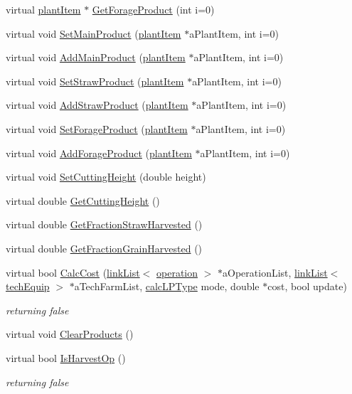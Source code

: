 \begin{DoxyCompactItemize}
\item 
virtual \hyperlink{classplant_item}{plantItem} $\ast$ \hyperlink{classharvest_fields_a8eea5e22cb934b9582c5bd168135390b}{GetForageProduct} (int i=0)
\item 
virtual void \hyperlink{classharvest_fields_abf0a1c96f2c3fd07843970bc1c4ae157}{SetMainProduct} (\hyperlink{classplant_item}{plantItem} $\ast$aPlantItem, int i=0)
\item 
virtual void \hyperlink{classharvest_fields_a815c019544bfb711da8dd32cc3be9974}{AddMainProduct} (\hyperlink{classplant_item}{plantItem} $\ast$aPlantItem, int i=0)
\item 
virtual void \hyperlink{classharvest_fields_ae88064e2d377dc620294bf23ef43efa4}{SetStrawProduct} (\hyperlink{classplant_item}{plantItem} $\ast$aPlantItem, int i=0)
\item 
virtual void \hyperlink{classharvest_fields_a3928ce56a1f4783c76be19dca31a59ab}{AddStrawProduct} (\hyperlink{classplant_item}{plantItem} $\ast$aPlantItem, int i=0)
\item 
virtual void \hyperlink{classharvest_fields_a92f27195932617ba70c3c7043bf9898d}{SetForageProduct} (\hyperlink{classplant_item}{plantItem} $\ast$aPlantItem, int i=0)
\item 
virtual void \hyperlink{classharvest_fields_a89f89e2f7d4efeb1905320514cd747b0}{AddForageProduct} (\hyperlink{classplant_item}{plantItem} $\ast$aPlantItem, int i=0)
\item 
virtual void \hyperlink{classharvest_fields_a866acc00456f874d384414c557818194}{SetCuttingHeight} (double height)
\item 
virtual double \hyperlink{classharvest_fields_a2f6612b8edd1ad8a89f5df4890b990c7}{GetCuttingHeight} ()
\item 
virtual double \hyperlink{classharvest_fields_ab9cb28e116628fc463de8eb6c39baf0a}{GetFractionStrawHarvested} ()
\item 
virtual double \hyperlink{classharvest_fields_adc76919fe377000c2c48276227cfd6ca}{GetFractionGrainHarvested} ()
\item 
virtual bool \hyperlink{classharvest_fields_a9fcfd4121d8290708c8db3da63a56d78}{CalcCost} (\hyperlink{classlink_list}{linkList}$<$ \hyperlink{classoperation}{operation} $>$ $\ast$aOperationList, \hyperlink{classlink_list}{linkList}$<$ \hyperlink{classtech_equip}{techEquip} $>$ $\ast$aTechFarmList, \hyperlink{typer_8h_af05cf854fc14086a0d6404be5ae9813f}{calcLPType} mode, double $\ast$cost, bool update)
\begin{DoxyCompactList}\small\item\em returning false \item\end{DoxyCompactList}\item 
virtual void \hyperlink{classharvest_fields_a283ca8cf777ec3a4fab5122cc827492f}{ClearProducts} ()
\item 
virtual bool \hyperlink{classharvest_fields_ab50f128112be82518c06028ecb470cb7}{IsHarvestOp} ()
\begin{DoxyCompactList}\small\item\em returning false \item\end{DoxyCompactList}\end{DoxyCompactItemize}
